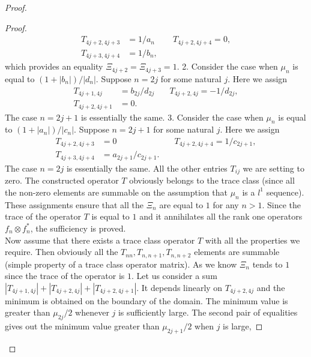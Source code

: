 \documentclass[12pt]{article}
\theoremstyle{definition}
\numberwithin{remark}{section}
\numberwithin{theorem}{section}
\numberwithin{prop}{section}
\numberwithin{equation}{section}
\numberwithin{lemma}{section}
\numberwithin{prop_under_lemma}{lemma}
\begin{document}
\begin{proof}
\begin{proof}
\begin{align*}
                T_{4j+2,4j+3}&=1/a_n & \quad T_{4j+2,4j+4} = 0,\\
                T_{4j+3,4j+4}&=1/b_n,
            \end{align*}
            which provides an equality $\Xi_{4j+2} = \Xi_{4j+3} = 1$.
            2. Consider the case when $\mu_n$ is equal to $(1 + |b_n|)/|d_n|$. 
            Suppose $n = 2j$ for some natural $j$.
            Here we assign
            \begin{align*}
                T_{4j+1,4j} &= b_{2j}/d_{2j} & \quad T_{4j+2,4j} = -1/d_{2j},\\
                T_{4j+2,4j+1} &= 0.
            \end{align*}
            The case $n = 2j + 1$ is essentially the same.
            3. Consider the case when $\mu_n$ is equal to $(1 + |a_n|)/|c_n|$. 
            Suppose $n = 2j + 1$ for some natural $j$.
            Here we assign
            \begin{align*}
                T_{4j+2,4j+3} &= 0 & \quad T_{4j+2,4j+4} = 1/c_{2j+1},\\
                T_{4j+3,4j+4} &= a_{2j+1}/c_{2j+1}.
            \end{align*}
            The case $n = 2j$ is essentially the same.
            All the other entries $T_{ij}$ we are setting to zero.
            The constructed operator $T$ obviously belongs to the trace class (since all the non-zero elements are summable 
            on the assumption that $\mu_n$ is a $l^1$ sequence).
            These assignments ensure that all the $\Xi_n$ are equal to $1$ for any $n > 1$.
            Since the trace of the operator $T$ is equal to
            $1$ and it annihilates all the rank one operators $f_n \otimes f^*_n$, the sufficiency is proved.
            \medskip\\
            Now assume that there exists a trace class operator $T$ with all the properties we require.
            Then obviously all the $T_{nn}, T_{n, n+1}, T_{n, n+2}$ elements are summable (simple property of
            a trace class operator matrix).
            As we know $\Xi_n$ tends to $1$ since the trace of the operator is $1$. Let us consider a sum
            $|T_{4j+1, 4j}| + |T_{4j+2,4j}| + |T_{4j+2,4j+1}|$. It depends linearly on $T_{4j+2, 4j}$ and the minimum
            is obtained on the boundary of the domain. The minimum value is greater than $\mu_{2j}/2$ whenever $j$ is
            sufficiently large.
            The second pair of equalities gives out the minimum value greater than $\mu_{2j+1}/2$ when $j$ is large,

\end{proof}
\end{proof}
\end{document}
